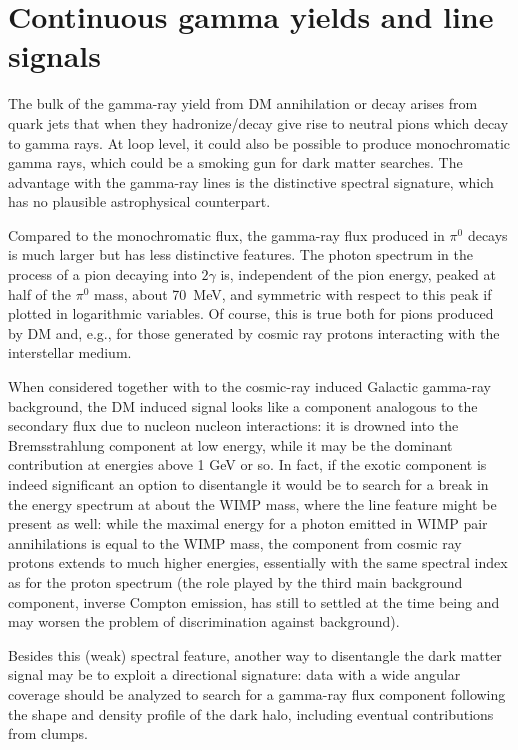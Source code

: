 \documentclass[a4paper,10pt,oneside]{book}
\begin{document}
\section{Continuous gamma yields and line signals}

The bulk of the gamma-ray yield from DM annihilation or decay arises from quark 
jets that when they hadronize/decay give rise to neutral pions which decay to
gamma rays. At loop level, it could also be possible to produce monochromatic gamma rays, 
which could be a smoking gun for dark matter searches. The advantage with the gamma-ray lines 
is the distinctive spectral signature, which has no plausible astrophysical counterpart. 

Compared to the monochromatic flux, the gamma-ray flux produced in 
$\pi^0$ decays is much larger but has less distinctive features.
The photon spectrum in the process of a pion decaying into $2\gamma$ is, 
independent of the pion energy, peaked at half of the $\pi^0$ mass, 
about 70~MeV, and symmetric with respect to this peak if plotted in 
logarithmic variables. Of course, this is true both for pions produced by DM 
and, e.g., for those generated by cosmic ray protons interacting with the interstellar medium.

When considered together with to the cosmic-ray induced Galactic gamma-ray
background, the DM induced signal looks like a component analogous
to the secondary flux due to nucleon nucleon interactions: it is
drowned into the Bremsstrahlung component at low energy, while it may 
be the dominant contribution at energies above 1 GeV or so. 
In fact, if the exotic component is indeed significant
an option to disentangle it would be to search for a break in the
energy spectrum at about the WIMP mass, where the line feature
might be present as well: while the maximal energy for a photon emitted 
in WIMP pair annihilations is equal to the WIMP mass,
the component from cosmic ray protons extends to much higher energies,
essentially with the same spectral index as for the proton spectrum
(the role played by the third main background component, 
inverse Compton emission, has still to settled at the time being and
may worsen the problem of discrimination against background).

Besides this (weak) spectral feature, another way to disentangle
the dark matter signal may be to exploit a directional signature:
data with a wide angular coverage should be analyzed to search for 
a gamma-ray flux component following the shape and density profile 
of the dark halo, including eventual contributions from clumps.
\end{document}
